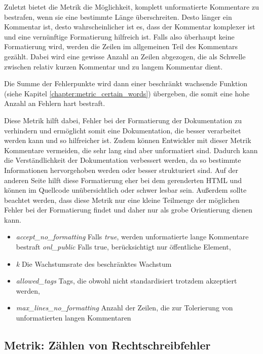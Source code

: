 Zuletzt bietet die Metrik die Möglichkeit, komplett unformatierte Kommentare zu bestrafen, wenn sie eine bestimmte Länge überschreiten. Desto länger ein Kommentar ist, desto wahrscheinlicher ist es, dass der Kommentar komplexer ist und eine vernünftige Formatierung hilfreich ist. Falls also überhaupt keine Formatierung wird, werden die Zeilen im allgemeinen Teil des Kommentars gezählt. Dabei wird  eine gewisse Anzahl an Zeilen abgezogen, die als Schwelle zwischen relativ kurzen Kommentar und zu langem Kommentar dient. 

Die Summe der Fehlerpunkte wird dann einer beschränkt wachsende Funktion (siehe Kapitel \ref{chapter:metric_certain_words}) übergeben, die somit eine hohe Anzahl an Fehlern hart bestraft.

Diese Metrik hilft dabei, Fehler bei der Formatierung der Dokumentation zu verhindern und ermöglicht somit eine Dokumentation, die besser verarbeitet werden kann und so hilfreicher ist. Zudem können Entwickler mit dieser Metrik Kommentare vermeiden, die sehr lang sind aber unformatiert sind. Dadurch kann die Verständlichkeit der Dokumentation verbessert werden, da so bestimmte Informationen hervorgehoben werden oder besser strukturiert sind. Auf der anderen Seite hilft diese Formatierung eher bei dem gerenderten \ac{HTML} und können im Quellcode unübersichtlich oder schwer lesbar sein. Außerdem sollte beachtet werden, dass diese Metrik nur eine kleine Teilmenge der möglichen Fehler bei der Formatierung findet und daher nur als grobe Orientierung dienen kann. 

 \begin{itemize}
    \item \textit{accept\_no\_formatting} Falls \textit{true}, werden unformatierte lange Kommentare bestraft
    \textit{onl\_public} Falls true, berücksichtigt nur öffentliche Element,
    \item \textit{k} Die Wachstumsrate des beschränktes Wachstum
     \item \textit{allowed\_tags} Tags, die obwohl nicht standardisiert trotzdem akzeptiert werden,
    \item \textit{max\_lines\_no\_formatting} Anzahl der Zeilen, die zur Tolerierung von unformatierten langen Kommentaren  
 \end{itemize}
 \subsection{Metrik: Zählen von Rechtschreibfehler}\label{chapter:metric_spelling}
 

